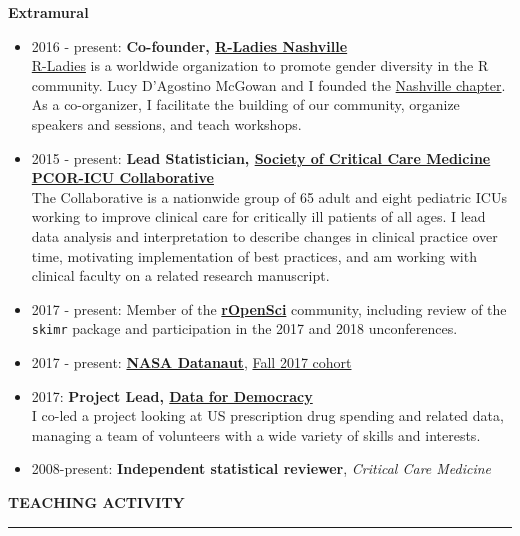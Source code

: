 \documentclass[5pt]{article}
\begin{document}
\noindent \textbf{Extramural}
\begin{itemize}
\item 2016 - present: \textbf{Co-founder, \href{https://www.meetup.com/rladies-nashville}{R-Ladies Nashville}}\\
\indent \href{http://www.rladies.org}{R-Ladies} is a worldwide organization to promote gender diversity in the R community. Lucy D'Agostino McGowan and I founded the \href{https://www.meetup.com/rladies-nashville}{Nashville chapter}.  As a co-organizer, I facilitate the building of our community, organize speakers and sessions, and teach workshops.
\item 2015 - present: \textbf{Lead Statistician, \href{http://www.sccm.org/Research/Quality/Pages/PCOR.aspx}{Society of Critical Care Medicine PCOR-ICU Collaborative}}\\
\indent The Collaborative is a nationwide group of 65 adult and eight pediatric ICUs working to improve clinical care for critically ill patients of all ages. I lead data analysis and interpretation to describe changes in clinical practice over time, motivating implementation of best practices, and am working with clinical faculty on a related research manuscript.
\item 2017 - present: Member of the  \textbf{\href{https://ropensci.org}{rOpenSci}} community, including review of the \texttt{skimr} package and participation in the 2017 and 2018 unconferences.
\item 2017 - present: \textbf{\href{https://open.nasa.gov/explore/datanauts/}{NASA Datanaut}}, \href{https://open.nasa.gov/explore/datanauts/2017/fall/}{Fall 2017 cohort}
\item 2017: \textbf{Project Lead, \href{http://datafordemocracy.org}{Data for Democracy}}\\ I co-led a project looking at US prescription drug spending and related data, managing a team of volunteers with a wide variety of skills and interests.
\item 2008-present: \textbf{Independent statistical reviewer}, \emph{Critical Care Medicine}
\end{itemize}

\clearpage
\noindent \linebreak \textbf{TEACHING ACTIVITY}\\
\rule[5pt]{\linewidth}{1.0pt}
\end{document}
